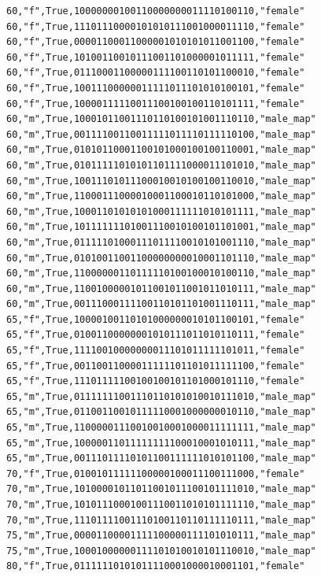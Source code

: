 \documentclass[authoryearcitations]{UoYCSproject}
\begin{document}
\begin{framed}
\begin{verbatim}
60,"f",True,10000000100110000000011110100110,"female"
60,"f",True,11101110000101010111001000011110,"female"
60,"f",True,00001100011000001010101011001100,"female"
60,"f",True,10100110010111001101000001011111,"female"
60,"f",True,01110001100000111100110101100010,"female"
60,"f",True,10011100000011111011101010100101,"female"
60,"f",True,10000111110011100100100110101111,"female"
60,"m",True,10001011001110110100101001110110,"male_map"
60,"m",True,00111100110011111011110111110100,"male_map"
60,"m",True,01010110001100101000100100110001,"male_map"
60,"m",True,01011111010101101111000011101010,"male_map"
60,"m",True,10011101011100010010100100110010,"male_map"
60,"m",True,11000111000010001100010110101000,"male_map"
60,"m",True,10001101010101000111111010101111,"male_map"
60,"m",True,10111111101001110010100101101001,"male_map"
60,"m",True,01111101000111011110010101001110,"male_map"
60,"m",True,01010011001100000000010001101110,"male_map"
60,"m",True,11000000110111110100100010100110,"male_map"
60,"m",True,11001000001011001011001011010111,"male_map"
60,"m",True,00111000111100110101101001110111,"male_map"
65,"f",True,10000100110101000000010101100101,"female"
65,"f",True,01001100000001010111011010110111,"female"
65,"f",True,11110010000000011101011111101011,"female"
65,"f",True,00110011000011111101101011111100,"female"
65,"f",True,11101111100100100101101000101110,"female"
65,"m",True,01111111001110110101010010111010,"male_map"
65,"m",True,01100110010111110001000000010110,"male_map"
65,"m",True,11000001110010010001000011111111,"male_map"
65,"m",True,10000011011111111100010001010111,"male_map"
65,"m",True,00111011110101100111111010101100,"male_map"
70,"f",True,01001011111100000100011100111000,"female"
70,"m",True,10100001011011001011100101111010,"male_map"
70,"m",True,10101110001001110011010101111110,"male_map"
70,"m",True,11101111001110100110110111110111,"male_map"
75,"m",True,00001100001111100000111101010111,"male_map"
75,"m",True,10001000000111101010010101110010,"male_map"
80,"f",True,01111110101011110001000010001101,"female"
\end{verbatim}
\end{framed}
\end{document}
